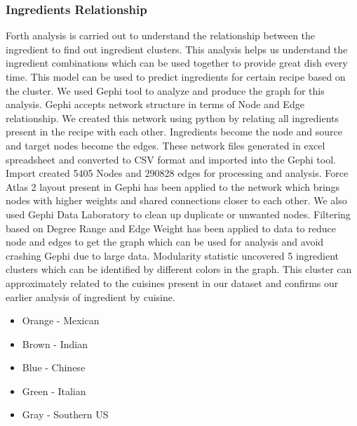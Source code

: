\documentclass[sigconf]{acmart}
\begin{document}
\subsubsection{Ingredients Relationship}
Forth analysis is carried out to understand the relationship between the ingredient to find out ingredient clusters. This analysis helps us understand the ingredient combinations which can be used together to provide great dish every time. This model can be used to predict ingredients for certain recipe based on the cluster. We used Gephi tool to analyze and produce the graph for this analysis. Gephi accepts network structure in terms of Node and Edge relationship. We created this network using python by relating all ingredients present in the recipe with each other. Ingredients become the node and source and target nodes become the edges. These network files generated in excel spreadsheet and converted to CSV format and imported into the Gephi tool. Import created 5405 Nodes and 290828 edges for processing and analysis. Force Atlas 2 layout present in Gephi has been applied to the network which brings nodes with higher weights and shared connections closer to each other. We also used Gephi Data Laboratory to clean up duplicate or unwanted nodes. Filtering based on Degree Range and Edge Weight has been applied to data to reduce node and edges to get the graph which can be used for analysis and avoid crashing Gephi due to large data. Modularity statistic uncovered 5 ingredient clusters which can be identified by different colors in the graph. This cluster can approximately related to the cuisines present in our dataset and confirms our earlier analysis of ingredient by cuisine.
\begin{itemize}
\item Orange - Mexican
\item Brown  - Indian
\item Blue   - Chinese
\item Green  - Italian
\item Gray   - Southern US
\end{itemize}
\end{document}
